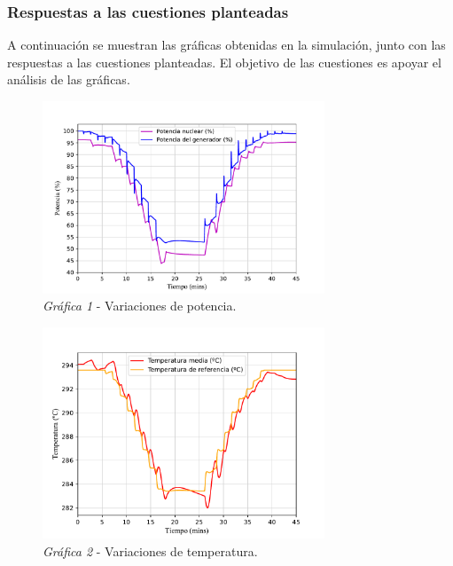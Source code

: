 \subsubsection{Respuestas a las cuestiones planteadas}

A continuación se muestran las gráficas obtenidas en la simulación, junto con las respuestas a las cuestiones planteadas. El objetivo de las cuestiones es apoyar el análisis de las gráficas. 

\begin{figure}[!h]
  \centering
  \includegraphics[width=0.75\textwidth]{content/figures/sim1_potencias.pdf}
  \vspace{-0.3cm}
  \caption{\textit{Gráfica 1} - Variaciones de potencia.}
  \label{fig:sim1_potencias}
\end{figure}

\begin{figure}[h]
  \centering
  \includegraphics[width=0.75\textwidth]{content/figures/sim1_temperaturas.pdf}
  \vspace{-0.3cm}
  \caption{\textit{Gráfica 2} - Variaciones de temperatura.}
  \label{fig:sim1_temperaturas}
\end{figure}

